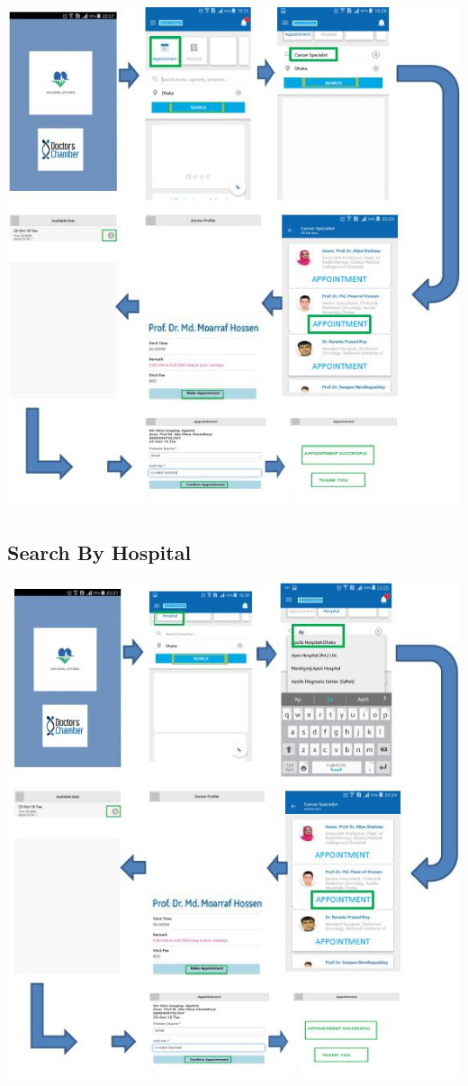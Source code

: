 \documentclass[12pt]{article}
\begin{document}
\includegraphics[scale = 0.99]{doctor.PNG}\\[1.0 cm]
\pagebreak

\subsection {Search By Hospital}

\includegraphics[scale = 0.99]{hospital.PNG}\\[1.0 cm]
\pagebreak
\end{document}
